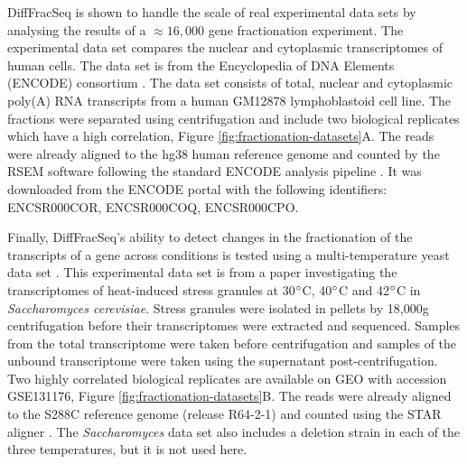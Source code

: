 \documentclass[../main.tex]{subfiles}
\begin{document}
DiffFracSeq is shown to handle the scale of real experimental data sets by analysing the results of a $\approx16,000$ gene fractionation experiment.
The experimental data set compares the nuclear and cytoplasmic transcriptomes of human cells.
The data set is from the Encyclopedia of DNA Elements (ENCODE) consortium  \parencite{Dunham2012}. 
The data set consists of total, nuclear and cytoplasmic poly(A) RNA transcripts from a human GM12878 lymphoblastoid cell line.
The fractions were separated using centrifugation and include two biological replicates which have a high correlation, Figure \ref{fig:fractionation-datasets}A.
The reads were already aligned to the hg38 human reference genome and counted by the RSEM software \parencite{Li2011} following the standard ENCODE analysis pipeline \parencite{Luo2020}.
It was downloaded from the ENCODE portal with the following identifiers: ENCSR000COR, ENCSR000COQ, ENCSR000CPO.

Finally, DiffFracSeq's ability to detect changes in the fractionation of the transcripts of a gene across conditions is tested using a multi-temperature yeast data set \parencite{Iserman2020}.
This experimental data set is from a paper investigating the transcriptomes of heat-induced stress granules at 30$\degree$C, 40$\degree$C and 42$\degree$C in \textit{Saccharomyces cerevisiae}.
Stress granules were isolated in pellets by 18,000g centrifugation before their transcriptomes were extracted and sequenced.
Samples from the total transcriptome were taken before centrifugation and samples of the unbound transcriptome were taken using the supernatant post-centrifugation.
Two highly correlated biological replicates are available on GEO with accession GSE131176, Figure \ref{fig:fractionation-datasets}B.
The reads were already aligned to the S288C reference genome (release R64-2-1) and counted using the STAR aligner \parencite{Dobin2013}.
The \textit{Saccharomyces} data set also includes a deletion strain in each of the three temperatures, but it is not used here. 
\end{document}
